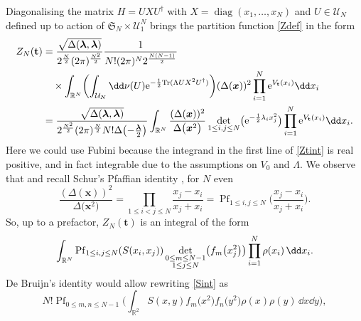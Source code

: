 Diagonalising the matrix $H = UXU^{\dagger}$ with $X = \operatorname{diag}(x_1,\dots,x_N)$ and $U \in \mathcal{U}_N$ defined up to action of $\mathfrak{S}_N \times \mathcal{U}_1^{N}$ brings the partition function \eqref{Zdef} in the form
\begin{align}
Z_N(\mathbf{t}) & = \frac{\sqrt{\Delta(\boldsymbol{\lambda},\boldsymbol{\lambda})}}{2^{\frac{N}{2}} (2\pi)^{\frac{N^2}{2}}} \frac{1}{N! (2\pi)^N 2^{\frac{N(N - 1)}{2}}} \nonumber\\
&\quad{}\times \int_{\mathbb{R}^N} \biggl(\int_{\mathcal{U}_N} \dd \nu(U) {\rm e}^{-\frac{1}{2}{\rm Tr}(\Lambda U X^2 U^{\dagger})}\biggr) (\Delta(\boldsymbol{x}))^2 \prod_{i = 1}^N {\rm e}^{V_{\mathbf{t}}(x_i)}\dd x_i \nonumber \\
& = \frac{\sqrt{\Delta(\boldsymbol{\lambda},\boldsymbol{\lambda})}}{2^{\frac{N^2}{2}} (2\pi)^{\frac{N}{2}} N! \Delta\bigl(-\frac{\boldsymbol{\lambda}}{2}\bigr)} \int_{\mathbb{R}^N} \frac{(\Delta(\boldsymbol{x}))^2}{\Delta\bigl(\boldsymbol{x}^2\bigr)} \mathop{\det}_{1 \leq i,j \leq N} \bigl({\rm e}^{-\frac{1}{2}\lambda_ix_j^2}\bigr) \prod_{i = 1}^N {\rm e}^{V_{\mathbf{t}}(x_i)} \dd x_i. \label{Ztint}
\end{align}
Here we could use Fubini because the integrand in the first line of \eqref{Ztint} is real positive, and in fact integrable due to the assumptions on $V_0$ and $\Lambda$. We observe that  and recall Schur's Pfaffian identity \cite{Schur1911}, for $N$ even
\[
\frac{(\Delta(\boldsymbol{x}))^2}{\Delta\bigl(\boldsymbol{x}^2\bigr)} = \prod_{1 \leq i < j \leq N} \frac{x_j - x_i}{x_j + x_i} = \operatorname{Pf}_{1 \leq i,j \leq N}\biggl(\frac{x_j - x_i}{x_j + x_i}\biggr).
\]
So, up to a prefactor, $Z_N(\mathbf{t})$ is an integral of the form
\begin{equation}
\label{Sint}
\int_{\mathbb{R}^N} \operatorname{Pf}_{1 \leq i,j \leq N} (S(x_i,x_j)) \mathop{{\rm det}}_{\substack{0 \leq m \leq N - 1 \\ 1 \leq j \leq N}} \bigl(f_m\bigl(x_j^2\bigr)\bigr) \prod_{i = 1}^N \rho(x_i)\,\dd x_i.
\end{equation}
De Bruijn's identity \cite{deBruijn1955} would allow rewriting \eqref{Sint} as
\begin{equation}
\label{dJ}
N! \operatorname{Pf}_{0 \leq m,n \leq N - 1}\biggl(\int_{\mathbb{R}^2} S(x,y) f_m\bigl(x^2\bigr)f_n\bigl(y^2\bigr)\rho(x)\rho(y)\,\dd x \dd y\biggr),
\end{equation}
